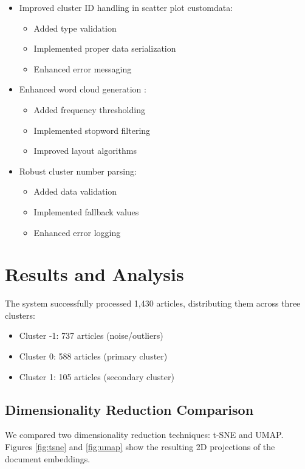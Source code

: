 \documentclass[conference]{IEEEtran}
\begin{document}
\begin{itemize}
    \item Improved cluster ID handling in scatter plot customdata:
        \begin{itemize}
            \item Added type validation
            \item Implemented proper data serialization
            \item Enhanced error messaging
        \end{itemize}
    \item Enhanced word cloud generation \citep{mcinerney2017exploring}:
        \begin{itemize}
            \item Added frequency thresholding
            \item Implemented stopword filtering
            \item Improved layout algorithms
        \end{itemize}
    \item Robust cluster number parsing:
        \begin{itemize}
            \item Added data validation
            \item Implemented fallback values
            \item Enhanced error logging
        \end{itemize}
\end{itemize}

\section{Results and Analysis}
The system successfully processed 1,430 articles, distributing them across three clusters:
\begin{itemize}
    \item Cluster -1: 737 articles (noise/outliers)
    \item Cluster 0: 588 articles (primary cluster)
    \item Cluster 1: 105 articles (secondary cluster)
\end{itemize}

\subsection{Dimensionality Reduction Comparison}
We compared two dimensionality reduction techniques: t-SNE and UMAP. Figures \ref{fig:tsne} and \ref{fig:umap} show the resulting 2D projections of the document embeddings.
\end{document}
